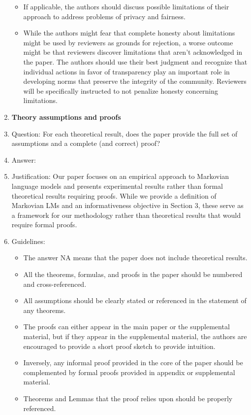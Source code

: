 \documentclass{article}
\begin{document}
\begin{enumerate}
\begin{itemize}
        \item If applicable, the authors should discuss possible limitations of their approach to address problems of privacy and fairness.
        \item While the authors might fear that complete honesty about limitations might be used by reviewers as grounds for rejection, a worse outcome might be that reviewers discover limitations that aren't acknowledged in the paper. The authors should use their best judgment and recognize that individual actions in favor of transparency play an important role in developing norms that preserve the integrity of the community. Reviewers will be specifically instructed to not penalize honesty concerning limitations.
    \end{itemize}

\item {\bf Theory assumptions and proofs}
    \item[] Question: For each theoretical result, does the paper provide the full set of assumptions and a complete (and correct) proof?
    \item[] Answer: \answerNA{} %
    \item[] Justification: Our paper focuses on an empirical approach to Markovian language models and presents experimental results rather than formal theoretical results requiring proofs. While we provide a definition of Markovian LMs and an informativeness objective in Section 3, these serve as a framework for our methodology rather than theoretical results that would require formal proofs.
    \item[] Guidelines:
    \begin{itemize}
        \item The answer NA means that the paper does not include theoretical results. 
        \item All the theorems, formulas, and proofs in the paper should be numbered and cross-referenced.
        \item All assumptions should be clearly stated or referenced in the statement of any theorems.
        \item The proofs can either appear in the main paper or the supplemental material, but if they appear in the supplemental material, the authors are encouraged to provide a short proof sketch to provide intuition. 
        \item Inversely, any informal proof provided in the core of the paper should be complemented by formal proofs provided in appendix or supplemental material.
        \item Theorems and Lemmas that the proof relies upon should be properly referenced. 
    \end{itemize}


\end{enumerate}
\end{document}

